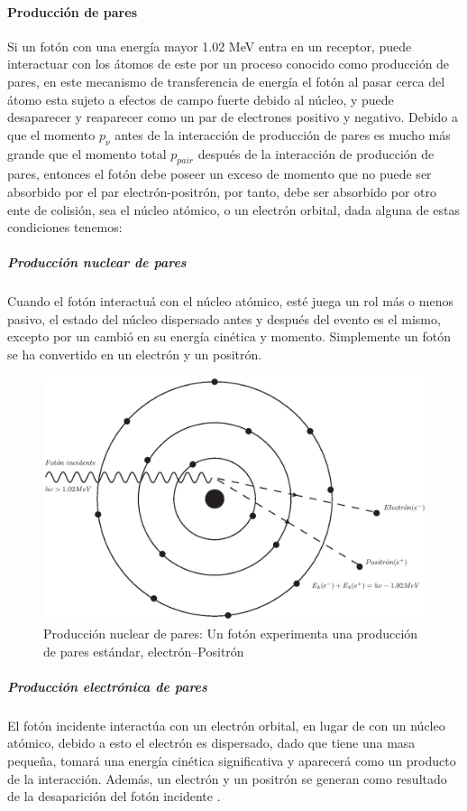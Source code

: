 \paragraph{Producción de pares}
Si un fotón con una energía mayor  1.02 MeV entra en un receptor, puede interactuar con los átomos de este por un proceso conocido como producción de pares, en este mecanismo de transferencia de energía el fotón al pasar cerca del átomo esta sujeto a efectos de campo fuerte debido al núcleo, y puede desaparecer y reaparecer como un par de electrones positivo y negativo.\cite{Edward}
Debido a que el momento $p_\nu$ antes de la interacción de producción de pares es mucho más grande que el momento total  $p_{pair}$ después de la interacción de producción de pares,  entonces el fotón debe poseer un exceso de momento que no puede ser absorbido por el par electrón-positrón, por tanto, debe ser absorbido por otro ente de colisión, sea el núcleo atómico, o un electrón orbital\cite{Podgorsak}, dada alguna de estas condiciones tenemos:
\subparagraph{Producción nuclear de pares}
 Cuando el fotón interactuá con el núcleo atómico, esté juega un rol más o menos pasivo, el estado del núcleo dispersado antes y después del evento es el mismo, excepto por un cambió en su energía cinética y momento. Simplemente un fotón se ha convertido en un electrón y un positrón\cite{Edward}.
\begin{figure}[htbp]
    \centering
    \includegraphics[width=.71\linewidth]{./Figures/nuclearpp.eps}
    \caption[Producción nuclear de pares]{Producción nuclear de pares: Un fotón experimenta una producción de pares estándar, electrón--Positrón}
    \label{fig:UoC}
\end{figure}
\subparagraph{Producción electrónica de pares}
 El fotón incidente interactúa con un electrón orbital, en lugar de con un núcleo atómico, debido a esto el electrón es dispersado, dado que tiene una masa pequeña, tomará una energía cinética significativa y aparecerá como un producto de la interacción. Además, un electrón y un positrón se generan como resultado de la desaparición del fotón incidente \cite{Edward}.
